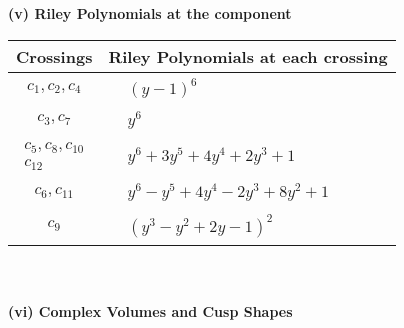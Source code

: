 \documentclass[1p]{elsarticle_modified}
\theoremstyle{definition}
\begin{document}
\newpage\renewcommand{\arraystretch}{1}
\flushleft \textbf{(v) Riley Polynomials at the component}\newline \\
\begin{tabular}{m{50pt}|m{274pt}}
Crossings & \hspace{64pt}Riley Polynomials at each crossing \\
\hline $$\begin{aligned}c_{1},c_{2},c_{4}\end{aligned}$$&$\begin{aligned}
&(y-1)^6
\end{aligned}$\\
\hline $$\begin{aligned}c_{3},c_{7}\end{aligned}$$&$\begin{aligned}
&y^6
\end{aligned}$\\
\hline $$\begin{aligned}c_{5},c_{8},c_{10}\\c_{12}\end{aligned}$$&$\begin{aligned}
&y^6+3 y^5+4 y^4+2 y^3+1
\end{aligned}$\\
\hline $$\begin{aligned}c_{6},c_{11}\end{aligned}$$&$\begin{aligned}
&y^6- y^5+4 y^4-2 y^3+8 y^2+1
\end{aligned}$\\
\hline $$\begin{aligned}c_{9}\end{aligned}$$&$\begin{aligned}
&(y^3- y^2+2 y-1)^2
\end{aligned}$\\
\hline
\end{tabular}\\~\\
\newpage\flushleft \textbf{(vi) Complex Volumes and Cusp Shapes}
\end{document}
